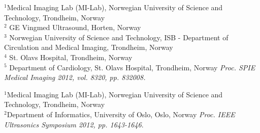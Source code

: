 \documentclass[10pt,b5paper,twoside]{book}
\begin{document}
\begin{bibunit}[ieeetr]
{
$^{1}$Medical Imaging Lab (MI-Lab), Norwegian University of Science and Technology, Trondheim, Norway\\
$^{2}$ GE Vingmed Ultrasound, Horten, Norway\\
$^{3}$ Norwegian University of Science and Technology, ISB - Department of Circulation and Medical Imaging, Trondheim, Norway\\
$^{4}$ St. Olavs Hospital, Trondheim, Norway\\
$^{5}$ Department of Cardiology, St. Olavs Hospital, Trondheim, Norway
}
\noindent \textit{Proc. SPIE Medical Imaging 2012, vol. 8320, pp. 832008.}
%
\end{bibunit}

\begin{bibunit}[ieeetr]
{
	$^{1}$Medical Imaging Lab (MI-Lab), Norwegian University of Science and Technology, Trondheim, Norway\\
    	$^{2}$Department of Informatics, University of Oslo, Oslo, Norway
}
\noindent \textit{Proc. IEEE Ultrasonics Symposium 2012, pp. 1643-1646}.
%
\end{bibunit}

\end{document}

